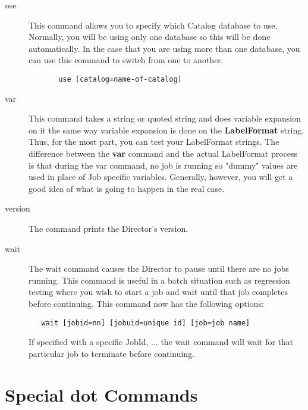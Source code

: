 \begin{description}
\begin{verbatim}
\end{verbatim}
\normalsize

\item [use]
   This command allows you to specify which Catalog  database to use. Normally,
you will be using only one database so  this will be done automatically. In
the case that you are using  more than one database, you can use this command
to switch from  one to another.  

\footnotesize
\begin{verbatim}
       use [catalog=name-of-catalog]
\end{verbatim}
\normalsize


\item [var]
   \label{var}
   This command takes a string or quoted string and  does variable expansion on
   it the same way variable expansion  is done on the {\bf LabelFormat} string.
   Thus, for the  most part, you can test your LabelFormat strings. The
   difference  between the {\bf var} command and the actual LabelFormat process 
   is that during the var command, no job is running so "dummy"  values are
   used in place of Job specific variables. Generally,  however, you will get a
   good idea of what is going to happen  in the real case.  

\item [version]
   The command prints the Director's version.  

\item [wait]
   The wait command causes the Director to pause  until there are no jobs
   running. This command is useful in  a batch situation such as regression
   testing where you  wish to start a job and wait until that job completes 
   before continuing. This command now has the following options:
\footnotesize
\begin{verbatim}
   wait [jobid=nn] [jobuid=unique id] [job=job name]
\end{verbatim}
\normalsize
   If specified with a specific JobId, ... the wait command will wait
   for that particular job to terminate before continuing.

\end{description}

\label{dotcommands}
\section{Special dot Commands}

